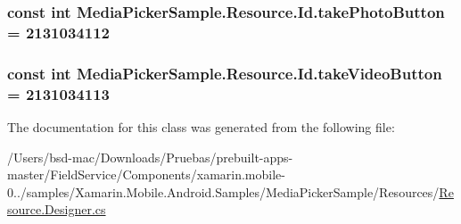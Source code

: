 \hypertarget{class_media_picker_sample_1_1_resource_1_1_id_a9d0195c50f43bdb45333c756f2ce6a24}{
\subsubsection[{take\+Photo\+Button}]{\setlength{\rightskip}{0pt plus 5cm}const int Media\+Picker\+Sample.\+Resource.\+Id.\+take\+Photo\+Button = 2131034112}}\label{class_media_picker_sample_1_1_resource_1_1_id_a9d0195c50f43bdb45333c756f2ce6a24}
\hypertarget{class_media_picker_sample_1_1_resource_1_1_id_ac7fad8b26b29a31f217fa601888615e9}{
\subsubsection[{take\+Video\+Button}]{\setlength{\rightskip}{0pt plus 5cm}const int Media\+Picker\+Sample.\+Resource.\+Id.\+take\+Video\+Button = 2131034113}}\label{class_media_picker_sample_1_1_resource_1_1_id_ac7fad8b26b29a31f217fa601888615e9}


The documentation for this class was generated from the following file\+:\begin{DoxyCompactItemize}
\item 
/\+Users/bsd-\/mac/\+Downloads/\+Pruebas/prebuilt-\/apps-\/master/\+Field\+Service/\+Components/xamarin.\+mobile-\/0../samples/\+Xamarin.\+Mobile.\+Android.\+Samples/\+Media\+Picker\+Sample/\+Resources/\hyperlink{_components_2xamarin_8mobile-0_86_81_2samples_2_xamarin_8_mobile_8_android_8_samples_2_media_picb4289798373573612b81d1923e7d12fa}{Resource.\+Designer.\+cs}\end{DoxyCompactItemize}
